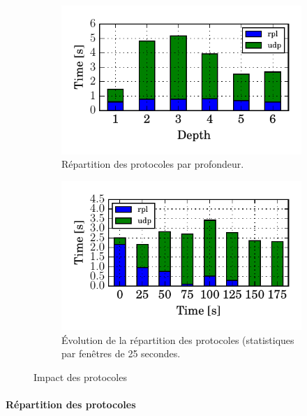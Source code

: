 \begin{figure}[ht]
  \begin{subfigure}{0.5\textwidth}
    \includegraphics[width=\textwidth]{img/protocol_repartition_depth.pdf}
    \caption{Répartition des protocoles par profondeur.}
    \label{supervision:fig:protocol_repartition}
  \end{subfigure}
  \begin{subfigure}{0.5\textwidth}
    \centering
    \includegraphics[width=\textwidth]{img/repartition_protocol.pdf}
    \caption{Évolution de la répartition des protocoles (statistiques par fenêtres de 25 secondes.}
    \label{supervision:fig:protocol_repartition_time}
  \end{subfigure}%
  \caption{Impact des protocoles}
\end{figure}

\paragraph{Répartition des protocoles}

